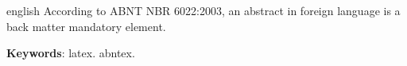 \documentclass[
	article,			%
	11pt,				%
	oneside,			%
	a4paper,			%
	english,			%
	brazil,				%
	sumario=tradicional
	]{abntex2}
\begin{document}
\renewcommand{\resumoname}{Abstract}
\begin{resumoumacoluna}
 \begin{otherlanguage*}{english}
   According to ABNT NBR 6022:2003, an abstract in foreign language is a back
   matter mandatory element.

   \vspace{\onelineskip}
 
   \noindent
   \textbf{Keywords}: latex. abntex.
 \end{otherlanguage*}  
\end{resumoumacoluna}




%
%







\end{document}
